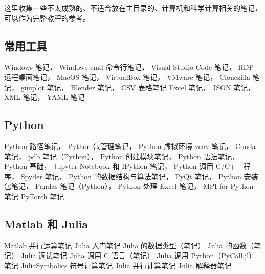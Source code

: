 
这里收集一些不太成熟的、不适合放在主目录的、计算机和科学计算相关的笔记，可以作为完整教程的参考。

\subsection{常用工具}
Windows 笔记，
Windows cmd 命令行笔记，
Visual Studio Code 笔记，
RDP 远程桌面笔记，
MacOS 笔记，
VirtualBox 笔记，
VMware 笔记，
Clonezilla 笔记，
gnuplot 笔记，
Blender 笔记，
CSV 表格笔记
Excel 笔记，
JSON 笔记，
XML 笔记，
YAML 笔记

\subsection{Python}
Python 路径笔记，
Python 包管理笔记，
Python 虚拟环境 venv 笔记，
Conda 笔记，
pdb 笔记（Python），
Python 创建模块笔记，
Python 语法笔记，
Python 基础，
Jupyter Notebook 和 IPython 笔记，
Python 调用 C/C++ 程序，
Spyder 笔记，
Python 的数据结构与算法笔记，
PyQt 笔记，
Python 安装包笔记，
Pandas 笔记（Python），
Python 处理 Excel 笔记，
MPI for Python 笔记
PyTorch 笔记

\subsection{Matlab 和 Julia}
Matlab 并行运算笔记
Julia 入门笔记
Julia 的数据类型（笔记）
Julia 的函数（笔记）
Julia 调试笔记
Julia 调用 C 语言（笔记）
Julia 调用 Python（PyCall.jl）笔记
JuliaSymbolics 符号计算笔记
Julia 并行计算笔记
Julia 解释器笔记

